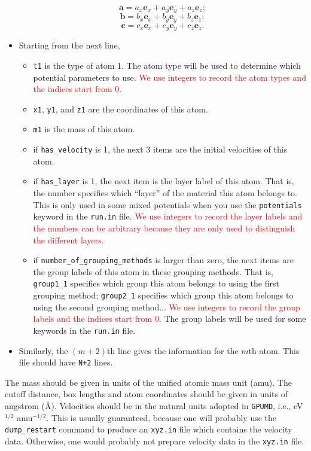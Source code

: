 \documentclass[12pt,a4paper]{report}
\newcommand{\vect}[1]{\boldsymbol{#1}}
\begin{document}
\begin{itemize}
\begin{equation}
\vect{a} = a_x \vect{e}_x + a_y \vect{e}_y + a_z \vect{e}_z;
\end{equation}
\begin{equation}
\vect{b} = b_x \vect{e}_x + b_y \vect{e}_y + b_z \vect{e}_z;
\end{equation}
\begin{equation}
\vect{c} = c_x \vect{e}_x + c_y \vect{e}_y + c_z \vect{e}_z.
\end{equation}
\item Starting from the next line, 
\begin{itemize}
\item \verb"t1" is the type of atom 1. The atom type will be used to determine which potential parameters to use. \textcolor{red}{We use integers to record the atom types and the indices start from 0.}
\item \verb"x1", \verb"y1", and \verb"z1" are the coordinates of this atom.
\item  \verb"m1" is the mass of this atom.
\item if  \verb"has_velocity" is 1, the next 3 items are the initial velocities of this atom.
\item if \verb"has_layer" is 1, the next item is the layer label of this atom. That is, the number specifies which ``layer'' of the material this atom belongs to. This is only used in some mixed potentials when you use the \verb"potentials" keyword in the \verb"run.in" file.  \textcolor{red}{We use integers to record the layer labels and the numbers can be arbitrary because they are only used to distinguish the different layers.}
\item if \verb"number_of_grouping_methods" is larger than zero, the next items are the group labels of this atom in these grouping methods. That is, \verb"group1_1" specifies which group this atom belongs to using the first grouping method; \verb"group2_1" specifies which group this atom belongs to using the second grouping method... \textcolor{red}{We use integers to record the group labels and the indices start from 0.} The group labels will be used for some keywords in the \verb"run.in" file. 
\end{itemize}
\item Similarly, the $(m+2)$th line gives the information for the $m$th atom. This file should have \verb"N+2" lines.
\end{itemize}

The mass should be given in units of the unified atomic mass unit (amu). The cutoff distance, box lengths and atom coordinates should be given in units of angstrom (\AA). Velocities should be in the natural units adopted in \verb"GPUMD", i.e., eV$^{1/2}$ amu$^{-1/2}$. This is usually guaranteed, because one will probably use the \verb"dump_restart" command to produce an \verb"xyz.in" file which contains the velocity data. Otherwise, one would probably not prepare velocity data in the \verb"xyz.in" file.
\end{document}
